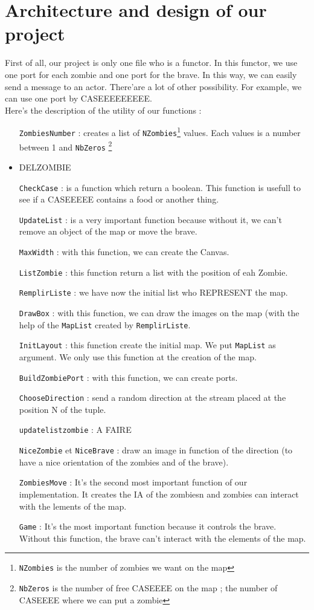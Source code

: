 \section*{Architecture and design of our project}
First of all, our project is only one file who is a functor. In this functor, we use one port for each zombie and one port for the brave. In this way, we can easily send a message to an actor. There'are a lot of other possibility. For example, we can use one port by CASEEEEEEEEE.\\
Here's the description of the utility of our functions :\\
\begin{itemize}
\item[\texttt{ZombiesNumber} :] creates a list of \texttt{NZombies}\footnote{\texttt{NZombies} is the number of zombies we want on the map} values. Each values is a number between 1 and \texttt{NbZeros} \footnote{\texttt{NbZeros} is the number of free CASEEEE on the map ; the number of CASEEEE where we can put a zombie}
\item DELZOMBIE
\item[\texttt{CheckCase} :] is a function which return a boolean. This function is usefull to see if a CASEEEEE contains a food or another thing.
\item[\texttt{UpdateList} :] is a very important function because without it, we can't remove an object of the map or move the brave.
\item[\texttt{MaxWidth} :] with this function, we can create the Canvas.
\item[\texttt{ListZombie} :] this function return a list with the position of eah Zombie.
\item[\texttt{RemplirListe} :] we have now the initial list who REPRESENT the map.
\item[\texttt{DrawBox} :] with this function, we can draw the images on the map (with the help of the \texttt{MapList} created by \texttt{RemplirListe}.
\item[\texttt{InitLayout} :] this function create the initial map. We put \texttt{MapList} as argument. We only use this function at the creation of the map.
\item[\texttt{BuildZombiePort} :] with this function, we can create ports.
\item[\texttt{ChooseDirection} :] send a random direction at the stream placed at the position N of the tuple.
\item[\texttt{updatelistzombie} :] A FAIRE
\item[\texttt{NiceZombie} et \texttt{NiceBrave} :] draw an image in function of the direction (to have a nice orientation of the zombies and of the brave).
\item[\texttt{ZombiesMove} :] It's the second most important function of our implementation. It creates the IA of the zombiesn and zombies can interact with the lements of the map.
\item[\texttt{Game} :] It's the most important function because it controls the brave. Without this function, the brave can't interact with the elements of the map.
\end{itemize}
